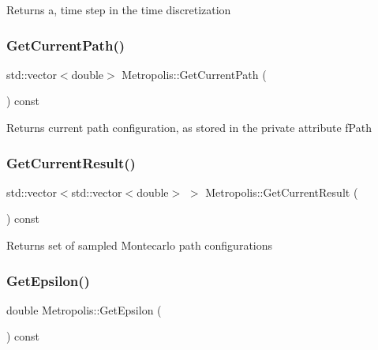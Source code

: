 \begin{DoxyReturn}{Returns}
a, time step in the time discretization 
\end{DoxyReturn}
\mbox{\label{classMetropolis_af58aa9fe0d0155534a9b1ad90fabbb9e}} 
\subsubsection{\texorpdfstring{Get\+Current\+Path()}{GetCurrentPath()}}
{\footnotesize\ttfamily std\+::vector$<$double$>$ Metropolis\+::\+Get\+Current\+Path (\begin{DoxyParamCaption}{ }\end{DoxyParamCaption}) const}

\begin{DoxyReturn}{Returns}
current path configuration, as stored in the private attribute f\+Path 
\end{DoxyReturn}
\mbox{\label{classMetropolis_ab8f12fd15c8f3b44bf7384918f9427c8}} 
\subsubsection{\texorpdfstring{Get\+Current\+Result()}{GetCurrentResult()}}
{\footnotesize\ttfamily std\+::vector$<$std\+::vector$<$double$>$ $>$ Metropolis\+::\+Get\+Current\+Result (\begin{DoxyParamCaption}{ }\end{DoxyParamCaption}) const}

\begin{DoxyReturn}{Returns}
set of sampled Montecarlo path configurations 
\end{DoxyReturn}
\mbox{\label{classMetropolis_abc94add65bfe37e91150b68ddbabfc55}} 
\subsubsection{\texorpdfstring{Get\+Epsilon()}{GetEpsilon()}}
{\footnotesize\ttfamily double Metropolis\+::\+Get\+Epsilon (\begin{DoxyParamCaption}{ }\end{DoxyParamCaption}) const}

